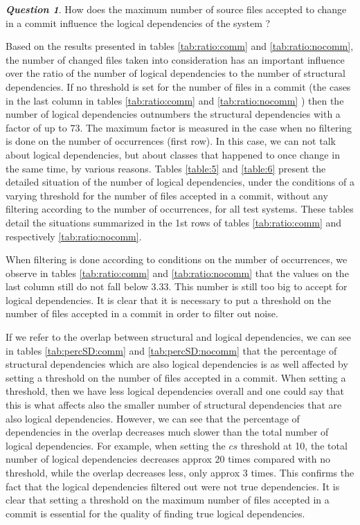 \documentclass[a4paper,twoside]{article}
\begin{document}
\textit{\textbf{Question 1}}. How does the maximum number of source files accepted to change in a commit influence the logical dependencies of the system ?

Based on the results presented in tables \ref{tab:ratio:comm} and \ref{tab:ratio:nocomm}, the number 
of changed files taken into consideration has an important influence over the ratio of the number  of 
logical dependencies to the number of structural dependencies.  If no threshold is set for the number of files in a commit (the cases in the last column in tables \ref{tab:ratio:comm} and 
\ref{tab:ratio:nocomm} ) then the number of logical dependencies outnumbers the structural dependencies with a factor of up to 73. The maximum factor is measured in the case when no filtering is done on the number of occurrences (first row).  
In this case, we can not talk about logical dependencies, but about classes that happened to once change in the same time, by various reasons. Tables \ref{table:5} and \ref{table:6}  present the detailed situation of the number of logical dependencies, under the conditions of a varying threshold for the number of files accepted in a commit, without any filtering according to the number of occurrences, for all test systems. These tables detail the situations summarized in the 1st rows of tables \ref{tab:ratio:comm} and respectively \ref{tab:ratio:nocomm}. 

When filtering is done according to conditions on the number of occurrences, we observe in tables \ref{tab:ratio:comm} and \ref{tab:ratio:nocomm} that the values on the last column still do not fall below 3.33. This number is still too big to accept for logical dependencies.  It is clear that it is necessary to  put a threshold on the number of files accepted in a commit in order to filter out noise.


If we refer to the overlap between structural and logical dependencies, we can see in tables \ref{tab:percSD:comm} and \ref{tab:percSD:nocomm} that the percentage of structural dependencies which are also logical dependencies is as well affected by setting a threshold on the number of files accepted in a commit. When setting a threshold, then we have less logical dependencies overall and one could say that this is what affects also the smaller number of structural dependencies that are also logical dependencies. However, we can see that the percentage of dependencies in the overlap decreases much slower than the total number of logical dependencies. For example, when setting  the $cs$ threshold at 10, the total number of logical dependencies decreases approx 20 times compared with no threshold, while the overlap decreases less, only approx 3 times. This confirms the fact that the logical dependencies filtered out were not true dependencies. It is clear that setting a threshold on the maximum number of files accepted in a commit is essential for the quality of finding true logical dependencies.
\end{document}
